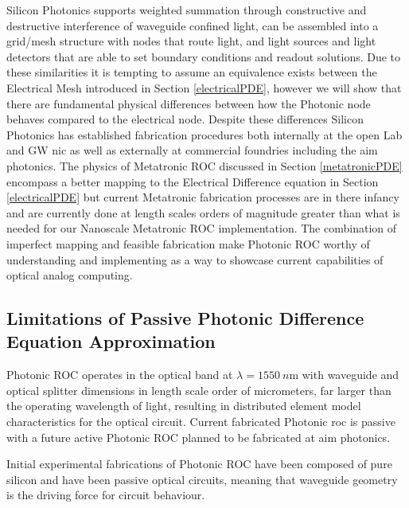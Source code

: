 \par Silicon Photonics supports weighted summation through constructive and destructive interference of waveguide confined light, can be assembled into a grid/mesh structure with nodes that route light, and light sources and light detectors that are able to set boundary conditions and readout solutions. Due to these similarities it is tempting to assume an equivalence exists between the Electrical Mesh introduced in Section \ref{electricalPDE}, however we will show that there are fundamental physical differences between how the Photonic node behaves compared to the electrical node. Despite these differences Silicon Photonics has established fabrication procedures both internally at the \acrfull{open} Lab and GW \acrfull{nic} as well as externally at commercial foundries including the \acrfull{aim photonics}. The physics of Metatronic ROC discussed in Section \ref{metatronicPDE} encompass a better mapping to the Electrical Difference equation in Section \ref{electricalPDE} but current Metatronic fabrication processes are in there infancy and are currently done at length scales \cite{estakhri2019inverse} orders of magnitude greater than what is needed for our Nanoscale Metatronic ROC implementation. The combination of imperfect mapping and feasible fabrication make Photonic ROC worthy of understanding and implementing as a way to showcase current capabilities of optical analog computing. 


\subsection{Limitations of Passive Photonic Difference Equation Approximation}

\par Photonic ROC operates in the optical band at $\lambda = \SI{1550}{n\meter}$ with waveguide and optical splitter dimensions in length scale order of micrometers, far larger than the operating wavelength of light, resulting in \gls{distributed element model} characteristics for the optical circuit. Current fabricated Photonic \acrshort{roc} is passive with a future active Photonic ROC planned to be fabricated at \acrshort{aim photonics}.

\par Initial experimental fabrications of Photonic ROC have been composed of pure silicon and have been \gls{passive optical} circuits, meaning that waveguide geometry is the driving force for circuit behaviour. 


